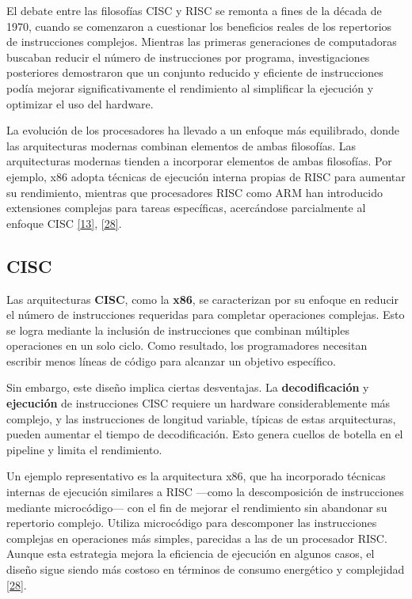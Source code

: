 \documentclass[12pt,oneside]{templates/unerthesis}
\begin{document}
El debate entre las filosofías CISC y RISC se remonta a fines de la década de 1970, cuando se comenzaron a cuestionar los beneficios reales de los repertorios de instrucciones complejos. Mientras las primeras generaciones de computadoras buscaban reducir el número de instrucciones por programa, investigaciones posteriores demostraron que un conjunto reducido y eficiente de instrucciones podía mejorar significativamente el rendimiento al simplificar la ejecución y optimizar el uso del hardware.

La evolución de los procesadores ha llevado a un enfoque más equilibrado, donde las arquitecturas modernas combinan elementos de ambas filosofías. Las arquitecturas modernas tienden a incorporar elementos de ambas filosofías. Por ejemplo, x86 adopta técnicas de ejecución interna propias de RISC para aumentar su rendimiento, mientras que procesadores RISC como ARM han introducido extensiones complejas para tareas específicas, acercándose parcialmente al enfoque CISC \protect\hyperlink{ref-hennessy2017computer}{{[}13{]}}, \protect\hyperlink{ref-patterson_computer_2014}{{[}28{]}}.

\hypertarget{cisc}{%
\subsection{CISC}\label{cisc}}

Las arquitecturas \textbf{CISC}, como la \textbf{x86}, se caracterizan por su enfoque en reducir el número de instrucciones requeridas para completar operaciones complejas. Esto se logra mediante la inclusión de instrucciones que combinan múltiples operaciones en un solo ciclo. Como resultado, los programadores necesitan escribir menos líneas de código para alcanzar un objetivo específico.

Sin embargo, este diseño implica ciertas desventajas. La \textbf{decodificación} y \textbf{ejecución} de instrucciones CISC requiere un hardware considerablemente más complejo, y las instrucciones de longitud variable, típicas de estas arquitecturas, pueden aumentar el tiempo de decodificación. Esto genera cuellos de botella en el pipeline y limita el rendimiento.

Un ejemplo representativo es la arquitectura x86, que ha incorporado técnicas internas de ejecución similares a RISC ---como la descomposición de instrucciones mediante microcódigo--- con el fin de mejorar el rendimiento sin abandonar su repertorio complejo. Utiliza microcódigo para descomponer las instrucciones complejas en operaciones más simples, parecidas a las de un procesador RISC. Aunque esta estrategia mejora la eficiencia de ejecución en algunos casos, el diseño sigue siendo más costoso en términos de consumo energético y complejidad \protect\hyperlink{ref-patterson_computer_2014}{{[}28{]}}.
\end{document}

